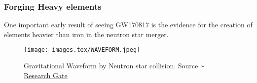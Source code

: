 \subsubsection{Forging Heavy elements}
One important early result of seeing GW170817 is the evidence for the creation of elements heavier than iron in the neutron star merger. 

\begin{figure}[h]
    \centering
    \texttt{[image: images.tex/WAVEFORM.jpeg]}
    \caption{Gravitational Waveform by Neutron star collision. Source :- \href{https://www.researchgate.net/figure/Binary-neutron-stars-GW-modes-m-3-2-4-4-6-6-8-8-of-polarization_fig13_233846764}{Research Gate}}
\end{figure}

\pagebreak
